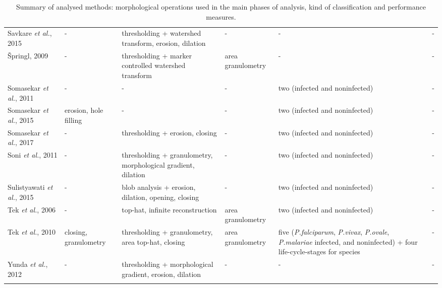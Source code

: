 \begin{longtable}{C{2.1cm} C{2.1cm} C{2.3cm} C{1.5cm} C{2.7cm} C{2.2cm} }
    Savkare \emph{et al.}, 2015  &
    	- &
    	thresholding + watershed transform, erosion, dilation  &
    	- &
    	- &
    	- \vspace{0.6cm} \\

    {\v{S}}pringl, 2009  &
    	- &
    	thresholding + marker controlled watershed transform  &
    	area granulometry &
    	- &
    	- \vspace{0.6cm} \\

Somasekar \emph{et al.}, 2011  &
    	- &
    	- &
    	- &
    	two (infected and noninfected) &
    	- \vspace{0.6cm} \\

    Somasekar \emph{et al.}, 2015  &
    	erosion, hole filling &
    	-  &
    	- &
    	two (infected and noninfected) &
    	- \vspace{0.6cm} \\

    Somasekar \emph{et al.}, 2017  &
    	- &
    	thresholding + erosion, closing  &
    	- &
    	two (infected and noninfected) &
    	- \vspace{0.6cm} \\
    
    Soni \emph{et al.}, 2011  &
    	- &
    	thresholding + granulometry, morphological gradient, dilation  &
    	- &
    	two (infected and noninfected) &
    	- \vspace{0.6cm} \\

    Sulistyawati \emph{et al.}, 2015  &
    	- &
    	blob analysis + erosion, dilation, opening, closing  &
    	- &
    	two (infected and noninfected) &
    	- \vspace{0.6cm} \\

 Tek \emph{et al.}, 2006  &
    	- &
    	top-hat, infinite reconstruction  &
    	area granulometry &
    	two (infected and noninfected) &
    	- \vspace{0.6cm} \\

    Tek \emph{et al.}, 2010  &
    	closing, granulometry &
    	thresholding + granulometry, area top-hat, closing  &
    	area granulometry &
    	five (\emph{P.falciparum}, \emph{P.vivax}, \emph{P.ovale}, \emph{P.malariae} infected, and noninfected) + 
    four life-cycle-stages for species &
    	- \vspace{0.6cm} \\

    Yunda \emph{et al.}, 2012  &
    	- &
    	thresholding + morphological gradient, erosion, dilation  &
    	- &
    	- &
    	- \\
    	  	
		 \hline
		
				
	\caption{Summary of analysed methods: morphological operations used in the main phases of analysis, kind of classification and performance measures.} %
	\label{tab:summary_table}
	\end{longtable}

	